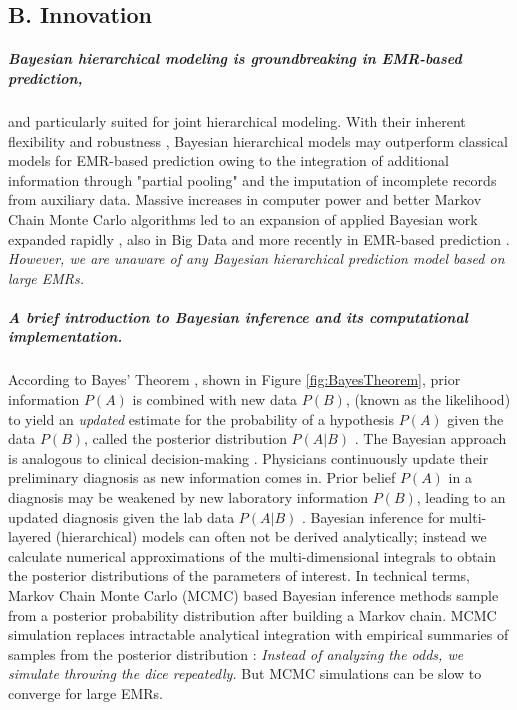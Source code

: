 \documentclass[11pt,notitlepage]{article}
\begin{document}
\subsection*{B. Innovation}

\subparagraph*{Bayesian hierarchical modeling is groundbreaking in EMR-based prediction,} and particularly suited for joint hierarchical modeling. With their inherent flexibility and robustness \cite{Carlin_1349763,Sutton_2012}, Bayesian hierarchical models may outperform classical models for EMR-based prediction owing to the integration of additional information through "partial pooling" \cite{Gelman_red_2009} and the imputation of incomplete records from auxiliary data. Massive increases in computer power and better Markov Chain Monte Carlo algorithms led to an expansion of applied Bayesian work expanded rapidly \cite{Ashby_16947924,Spiegelhalter_11134920}, also in Big Data \cite{Yoo_24987556} and more recently in EMR-based prediction \cite{Himes_19261943,Ryynaenen_23496851,Wu_20473190}. \textit{However, we are unaware of any Bayesian hierarchical prediction model based on large EMRs.} 

\subparagraph*{A brief introduction to Bayesian inference and its computational implementation.} According to Bayes' Theorem \cite{Thomas_Bayes}, shown in Figure \ref{fig:BayesTheorem}, prior information $P(A)$ is combined with new data $P(B)$, (known as the likelihood) to yield an \textit{updated} estimate for the probability of a hypothesis $P(A)$ given the data $P(B)$, called the posterior distribution $P(A|B)$ \cite{Kruschke_Book_2014}. The Bayesian approach is analogous to clinical decision-making \cite{Spiegelhalter_11134920}. Physicians continuously update their preliminary diagnosis as new information comes in. Prior belief $P(A)$ in a diagnosis may be weakened by new laboratory information $P(B)$, leading to an updated diagnosis given the lab data $P(A|B)$ \cite{Kruschke_22774788}. Bayesian inference for multi-layered (hierarchical) models can often not be derived analytically; instead we calculate numerical approximations of the multi-dimensional integrals to obtain the posterior distributions of the parameters of interest. In technical terms, Markov Chain Monte Carlo (MCMC) based Bayesian inference methods sample from a posterior probability distribution after building a Markov chain. MCMC simulation replaces intractable analytical integration with empirical summaries of samples from the posterior distribution \cite{Abrams_9483729}: \textit{Instead of analyzing the odds, we simulate throwing the dice repeatedly.} But MCMC simulations can be slow to converge for large EMRs.
\end{document}
